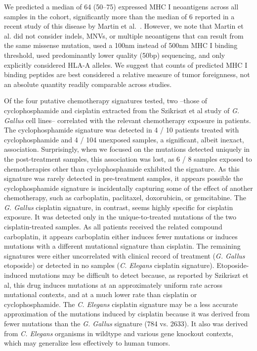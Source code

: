 We predicted a median of 64 (50--75) expressed MHC I neoantigens across all samples in the cohort, significantly more than the median of 6 reported in a recent study of this disease by Martin et al.~\cite{Martin_2016}. However, we note that Martin et al. did not consider indels, MNVs, or multiple neoantigens that can result from the same missense mutation, used a 100nm instead of 500nm MHC I binding threshold, used predominantly lower quality (50bp) sequencing, and only explicitly considered HLA-A alleles. We suggest that counts of predicted MHC I binding peptides are best considered a relative measure of tumor foreignness, not an absolute quantity readily comparable across studies.

Of the four putative chemotherapy signatures tested, two --those of cyclophosphamide and cisplatin extracted from the Szikriszt et al study of \textit{G. Gallus} cell lines-- correlated with the relevant chemotherapy exposure in patients. The cyclophosphamide signature was detected in 4 / 10 patients treated with cyclophosphamide and 4 / 104 unexposed samples, a significant, albeit inexact, association. Surprisingly, when we focused on the mutations detected uniquely in the post-treatment samples, this association was lost, as 6 / 8 samples exposed to chemotherapies other than cyclophosphamide exhibited the signature. As this signature was rarely detected in pre-treatment samples, it appears possible the cyclophosphamide signature is incidentally capturing some of the effect of another chemotherapy, such as carboplatin, paclitaxel, doxorubicin, or gemcitabine. The \textit{G. Gallus} cisplatin signature, in contrast, seems highly specific for cisplatin exposure. It was detected only in the unique-to-treated mutations of the two cisplatin-treated samples. As all patients received the related compound carboplatin, it appears carboplatin either induces fewer mutations or induces mutations with a different mutational signature than cisplatin. The remaining signatures were either uncorrelated with clinical record of treatment (\textit{G. Gallus} etoposide) or detected in no samples (\textit{C. Elegans} cisplatin signature). Etoposide-induced mutations may be difficult to detect because, as reported by Szikriszt et al, this drug induces mutations at an approximately uniform rate across mutational contexts, and at a much lower rate than cisplatin or cyclophosphamide. The \textit{C. Elegans} cisplatin signature may be a less accurate approximation of the mutations induced by cisplatin because it was derived from fewer mutations than the \textit{G. Gallus} signature (784 vs. 2633). It also was derived from \textit{C. Elegans} organisms in wildtype and various gene knockout contexts, which may generalize less effectively to human tumors.

